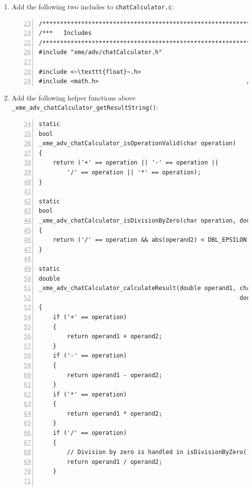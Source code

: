 \begin{enumerate}
\begin{lstlisting}[numbers=left,firstnumber=31]
	pos = strchr(pos+1, 0x20);
	if (NULL == pos)
	{
		strcpy_s(out, outSize, error_syntax);
		return;
	}
	operand2 = atof(pos+1);

	// Check for operator and division by zero
	if (!_xme_adv_chatCalculator_isOperationValid(op))
	{
		strcpy_s(out, outSize, error_op);
		return;
	}
	if (_xme_adv_chatCalculator_isDivisionByZero(op, operand2))
	{
		strcpy_s(out, outSize, error_zero);
		return;
	}

	// Calculate result
	result =
		_xme_adv_chatCalculator_calculateResult(operand1, op, operand2);

	// Output result
	sprintf_s
	(
		out, outSize, "%lf %c %lf = %lf",
		operand1, op, operand2, result
	);
}
\end{lstlisting}

	\item Add the following two includes to \verb|chatCalculator.c|:
	
\begin{lstlisting}[numbers=left,firstnumber=23]
/*************************************************************************/
/***   Includes                                                        ***/
/*************************************************************************/
#include "xme/adv/chatCalculator.h"

#include <~\texttt{float}~.h>                                          /~~/ Add this line
#include <math.h>                                          /~~/ Add this line
\end{lstlisting}

	\item Add the following helper functions above \verb|_xme_adv_chatCalculator_getResultString()|:

\begin{lstlisting}[numbers=left,firstnumber=34]
static
bool
_xme_adv_chatCalculator_isOperationValid(char operation)
{
	return ('+' == operation || '-' == operation ||
		'/' == operation || '*' == operation);
}

static
bool
_xme_adv_chatCalculator_isDivisionByZero(char operation, double operand2)
{
	return ('/' == operation && abs(operand2) < DBL_EPSILON);
}

static
double
_xme_adv_chatCalculator_calculateResult(double operand1, char operation,
                                                         double operand2)
{
	if ('+' == operation)
	{
		return operand1 + operand2;
	}
	if ('-' == operation)
	{
		return operand1 - operand2;
	}
	if ('*' == operation)
	{
		return operand1 * operand2;
	}
	if ('/' == operation)
	{
		// Division by zero is handled in isDivisionByZero()
		return operand1 / operand2;
	}


\end{lstlisting}
\end{enumerate}
